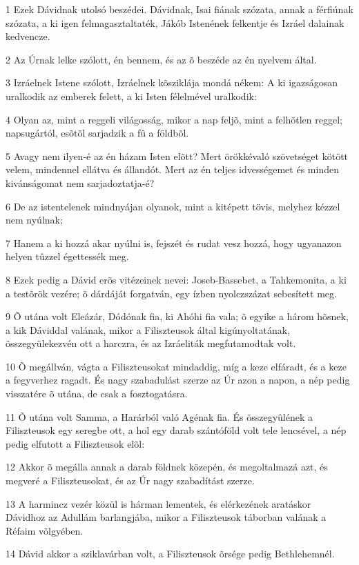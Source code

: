 \par 1 Ezek Dávidnak utolsó beszédei. Dávidnak, Isai fiának szózata, annak a férfiúnak szózata, a ki igen felmagasztaltaték, Jákób Istenének felkentje és Izráel dalainak kedvencze.
\par 2 Az Úrnak lelke szólott, én bennem, és az õ beszéde az én nyelvem által.
\par 3 Izráelnek Istene szólott, Izráelnek kõsziklája mondá nékem: A ki igazságosan uralkodik az emberek felett, a ki Isten félelmével uralkodik:
\par 4 Olyan az, mint a reggeli világosság, mikor a nap feljõ, mint a felhõtlen reggel; napsugártól, esõtõl sarjadzik a fû a földbõl.
\par 5 Avagy nem ilyen-é az én házam Isten elõtt? Mert örökkévaló szövetséget kötött velem, mindennel ellátva és állandót. Mert az én teljes idvességemet és minden kivánságomat  nem sarjadoztatja-é?
\par 6 De az istentelenek mindnyájan olyanok, mint a kitépett tövis, melyhez kézzel nem nyúlnak;
\par 7 Hanem a ki hozzá akar nyúlni is, fejszét és rudat vesz hozzá, hogy ugyanazon helyen tûzzel égettessék meg.
\par 8 Ezek pedig a Dávid erõs vitézeinek nevei: Joseb-Bassebet, a Tahkemonita, a ki a testõrök vezére; õ dárdáját forgatván, egy ízben nyolczszázat sebesített  meg.
\par 9 Õ utána volt Eleázár, Dódónak fia, ki Ahóhi fia vala; õ egyike a három hõsnek, a kik Dáviddal valának, mikor a Filiszteusok által kigúnyoltatának, összegyülekezvén ott a harczra, és az Izráeliták megfutamodtak volt.
\par 10 Õ megállván, vágta a Filiszteusokat mindaddig, míg a keze elfáradt, és a keze a fegyverhez ragadt. És nagy szabadulást szerze az Úr azon a napon, a nép pedig visszatére õ utána, de csak a fosztogatásra.
\par 11 Õ utána volt Samma, a Harárból való Agénak fia. És összegyûlének a Filiszteusok egy seregbe ott, a hol egy darab szántóföld volt tele lencsével, a nép pedig elfutott a Filiszteusok elõl:
\par 12 Akkor õ megálla annak a darab földnek közepén, és megoltalmazá azt, és megveré a Filiszteusokat, és az Úr nagy szabadítást szerze.
\par 13 A harmincz vezér közül is hárman lementek, és elérkezének aratáskor Dávidhoz az Adullám barlangjába, mikor a Filiszteusok táborban valának a Réfaim völgyében.
\par 14 Dávid akkor a sziklavárban volt, a Filiszteusok õrsége pedig Bethlehemnél.
